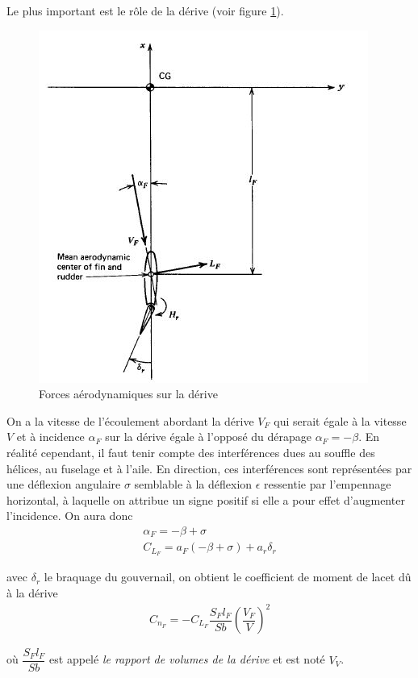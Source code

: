 \documentclass{report}
\begin{document}
Le plus important est le rôle de la dérive (voir figure \ref{30}).

\begin{figure}[h!]
    \centering
    \includegraphics[scale=0.7]{30.JPG}
    \caption{Forces aérodynamiques sur la dérive}
    \label{30}
\end{figure}

On a la vitesse de l'écoulement abordant la dérive $V_F$ qui serait égale à la vitesse $V$ et à incidence $\alpha_F$ sur la dérive égale à l'opposé du dérapage $\alpha_F=-\beta$. En réalité cependant, il faut tenir compte des interférences dues au souffle des hélices, au fuselage et à l'aile. En direction, ces interférences sont représentées par une déflexion angulaire $\sigma$ semblable à la déflexion $\epsilon$ ressentie par l'empennage horizontal, à laquelle on attribue un signe positif si elle a pour effet d'augmenter l'incidence. On aura donc
\begin{eqnarray}
\alpha_F=-\beta+\sigma\\
C_{L_F}=a_F(-\beta+\sigma)+a_r\delta_r
\end{eqnarray}

avec $\delta_r$ le braquage du gouvernail, on obtient le coefficient de moment de lacet dû à la dérive
\begin{eqnarray}
C_{n_F}=-C_{L_F}\dfrac{S_F l_F}{S b}\left(\dfrac{V_F}{V}\right)^2
\end{eqnarray}

où $\dfrac{S_F l_F}{S b}$ est appelé \textit{le rapport de volumes de la dérive} et est noté $V_V$.
\end{document}
